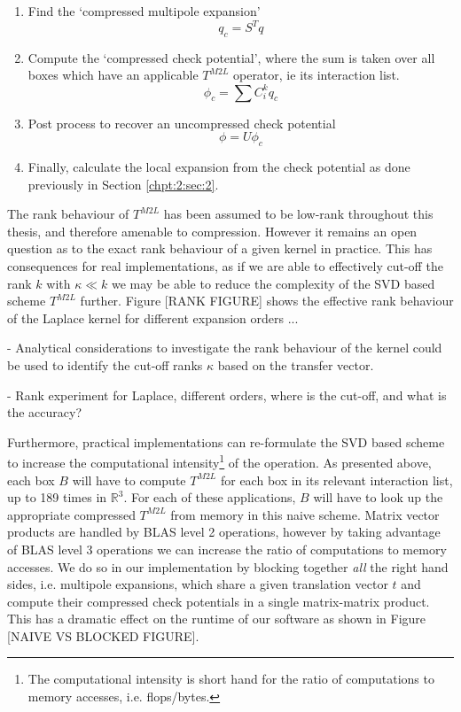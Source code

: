 \begin{enumerate}
    \item Find the `compressed multipole expansion'
    \[
    q_c = S^T q
    \]
    \item Compute the `compressed check potential', where the sum is taken over all boxes which have an applicable $T^{M2L}$ operator, ie its interaction list.
    \[
    \phi_c = \sum C^k_i q_c
    \]
    \item Post process to recover an uncompressed check potential
    \[
    \phi = U \phi_c
    \]
    \item Finally, calculate the local expansion from the check potential as done previously in Section \ref{chpt:2:sec:2}.
\end{enumerate}


The rank behaviour of $T^{M2L}$ has been assumed to be low-rank throughout this thesis, and therefore amenable to compression. However it remains an open question as to the exact rank behaviour of a given kernel in practice. This has consequences for real implementations, as if we are able to effectively cut-off the rank $k$ with $\kappa \ll k$ we may be able to reduce the complexity of the SVD based scheme $T^{M2L}$ further. Figure [RANK FIGURE] shows the effective rank behaviour of the Laplace kernel for different expansion orders ...

- Analytical considerations to investigate the rank behaviour of the kernel could be used to identify the cut-off ranks $\kappa$ based on the transfer vector.

- Rank experiment for Laplace, different orders, where is the cut-off, and what is the accuracy?

Furthermore, practical implementations can re-formulate the SVD based scheme to increase the computational intensity\footnote{The computational intensity is short hand for the ratio of computations to memory accesses, i.e. flops/bytes.} of the operation. As presented above, each box $B$ will have to compute $T^{M2L}$ for each box in its relevant interaction list, up to 189 times in $\mathbb{R}^3$. For each of these applications, $B$ will have to look up the appropriate compressed $T^{M2L}$ from memory in this naive scheme. Matrix vector products are handled by BLAS level 2 operations, however by taking advantage of BLAS level 3 operations we can increase the ratio of computations to memory accesses. We do so in our implementation by blocking together \textit{all} the right hand sides, i.e. multipole expansions, which share a given translation vector $t$ and compute their compressed check potentials in a single matrix-matrix product. This has a dramatic effect on the runtime of our software as shown in Figure [NAIVE VS BLOCKED FIGURE].


